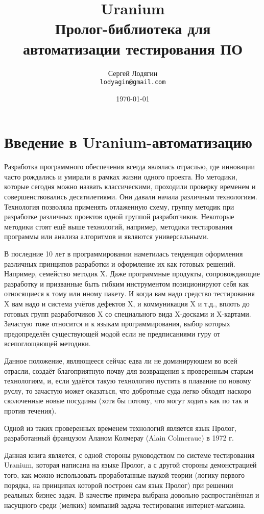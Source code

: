 \documentclass[a4paper]{book}
\def\td{т.\thinspace д.}
\def\ur{Uranium}
\begin{document}
\title{{\bf\ur}\\ \medskip  Пролог-библиотека для автоматизации
  тестирования ПО}
\author{Сергей Лодягин\\ \texttt{lodyagin@gmail.com}}
\date{\today}
\maketitle

\chapter{Введение в \ur-автоматизацию}

Разработка программного обеспечения всегда являлась отраслью, где
инновации часто рождались и умирали в рамках жизни одного
проекта. Но методики, которые сегодня можно назвать
классическими, проходили проверку временем и совершенствовались
десятилетиями. Они давали начала различным
технологиям. Технология позволяла применять отлаженную схему,
группу методик при разработке различных проектов одной группой
разработчиков. Некоторые методики стоят ещё выше технологий,
например, методики тестирования программы или анализа алгоритмов
и являются универсальными.

В последние 10 лет в программировании наметилась тенденция
оформления различных принципов разработки и оформление их как
готовых решений. Например, семейство методик X. Даже программные
продукты, сопровождающие разработку и призванные быть гибким
инструментом позиционируют себя как относящиеся к тому или иному
пакету. И когда вам надо средство тестирования X вам надо и
система учётов дефектов X, и коммуникация X и \td, вплоть до
готовых групп разработчиков X со специального вида X-досками и
X-картами.  Зачастую тоже относится и к языкам программирования,
выбор которых предопределён существующей модой если не
предписаниями гуру от всепоглощающей методики.

Данное положение, являющееся сейчас едва ли не доминирующем во
всей отрасли, создаёт благоприятную почву для возвращения к
проверенным старым технологиям, и, если удаётся такую технологию
пустить в плавание по новому руслу, то зачастую может оказаться,
что добротные суда легко обходят наскоро сколоченные новые
посудины (хотя бы потому, что могут ходить как по так и против
течения).

Одной из таких проверенных временем технологий является язык
Пролог, разработанный французом Аланом Колмерау (Alain Colmeraue)
в 1972 г.

Данная книга является, с одной стороны руководством по системе
тестирования \ur, которая написана на языке Пролог, а с другой
стороны демонстрацией того, как можно использовать проработанные
наукой теории (логику первого порядка, на принципах которой
построен сам язык Пролог) при решении реальных бизнес задач. В
качестве примера выбрана довольно распростанённая и насущного
среди (мелких) компаний задача тестирования интернет-магазина.
\end{document}
